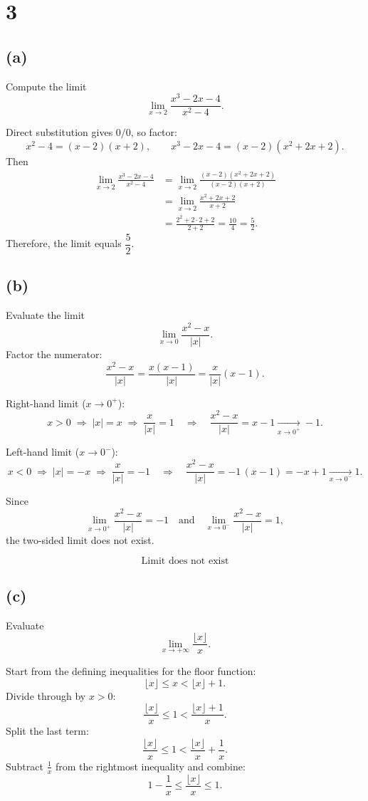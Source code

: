 \documentclass[12pt,a4paper]{article}
\theoremstyle{definition}
\theoremstyle{remark}
\begin{document}
\section*{3}
\subsection*{(a)}
Compute the limit
\[
\lim_{x\to 2}\frac{x^{3}-2x-4}{x^{2}-4}.
\]

Direct substitution gives \(0/0\), so factor:
\[
x^{2}-4=(x-2)(x+2),\qquad
x^{3}-2x-4=(x-2)(x^{2}+2x+2).
\]
Then
\begin{align*}
\lim_{x\to 2}\frac{x^{3}-2x-4}{x^{2}-4}
&=\lim_{x\to 2}\frac{(x-2)(x^{2}+2x+2)}{(x-2)(x+2)}\\
&=\lim_{x\to 2}\frac{x^{2}+2x+2}{x+2}\\
&=\frac{2^{2}+2\cdot 2+2}{2+2}
=\frac{10}{4}
=\frac{5}{2}.
\end{align*}
Therefore, the limit equals \(\dfrac{5}{2}\).

\subsection*{(b)}
Evaluate the limit
\[
\lim_{x\to 0}\frac{x^{2}-x}{|x|}.
\]
Factor the numerator:
\[
\frac{x^{2}-x}{|x|}=\frac{x(x-1)}{|x|}=\frac{x}{|x|}(x-1).
\]

Right-hand limit (\(x\to 0^{+}\)):
\[
x>0 \;\Rightarrow\; |x|=x \;\Rightarrow\; \frac{x}{|x|}=1
\quad\Longrightarrow\quad
\frac{x^{2}-x}{|x|}=x-1 \xrightarrow[x\to 0^{+}]{} -1.
\]

Left-hand limit (\(x\to 0^{-}\)):
\[
x<0 \;\Rightarrow\; |x|=-x \;\Rightarrow\; \frac{x}{|x|}=-1
\quad\Longrightarrow\quad
\frac{x^{2}-x}{|x|}=-1\,(x-1) = -x+1 \xrightarrow[x\to 0^{-}]{} 1.
\]

Since
\[
\lim_{x\to 0^{+}}\frac{x^{2}-x}{|x|} = -1
\quad\text{and}\quad
\lim_{x\to 0^{-}}\frac{x^{2}-x}{|x|} = 1,
\]
the two-sided limit does not exist.

\[
\boxed{\text{Limit does not exist}}
\]

\subsection*{(c)}
Evaluate
\[
\lim_{x\to +\infty}\frac{\lfloor x\rfloor}{x}.
\]

Start from the defining inequalities for the floor function:
\[
\lfloor x \rfloor \le x < \lfloor x \rfloor + 1.
\]
Divide through by \(x>0\):
\[
\frac{\lfloor x \rfloor}{x} \le 1 < \frac{\lfloor x \rfloor + 1}{x}.
\]
Split the last term:
\[
\frac{\lfloor x \rfloor}{x} \le 1 < \frac{\lfloor x \rfloor}{x} + \frac{1}{x}.
\]
Subtract \(\tfrac{1}{x}\) from the rightmost inequality and combine:
\[
1 - \frac{1}{x} \le \frac{\lfloor x \rfloor}{x} \le 1.
\]
\end{document}
